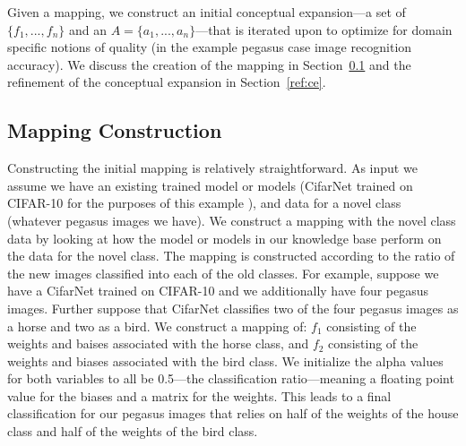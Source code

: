 \documentclass[letterpaper]{article}
\begin{document}
Given a mapping, we construct an initial conceptual expansion---a set of $\{f_1, ..., f_n\}$ and an $A=\{a_1, ..., a_n\}$---that is iterated upon to optimize for domain specific notions of quality (in the example pegasus case image recognition accuracy). 
We discuss the creation of the mapping in Section~\ref{ref:mapping} and the refinement of the conceptual expansion in Section~\ref{ref:ce}. 


\subsection{Mapping Construction}
\label{ref:mapping}

Constructing the initial mapping is relatively straightforward.
As input we assume we have an existing trained model or models (CifarNet trained on CIFAR-10 for the purposes of this example \cite{krizhevsky2009learning}), and data for a novel class (whatever pegasus images we have). We construct a mapping with the novel class data by looking at how the model or models in our knowledge base perform on the data for the novel class.
The mapping is constructed according to the ratio of the new images classified into each of the old classes. 
For example, suppose we have a CifarNet trained on CIFAR-10 and we additionally have four pegasus images.
Further suppose that CifarNet classifies two of the four pegasus images as a horse and two as a bird. 
We construct a mapping of: $f_1$ consisting of the weights and baises associated with the horse class, and $f_2$ consisting of the weights and biases associated with the bird class. We initialize the alpha values for both variables to all be 0.5---the classification ratio---meaning a floating point value for the biases and a matrix for the weights. This leads to a final classification for our pegasus images that relies on half of the weights of the house class and half of the weights of the bird class. 

\end{document}
